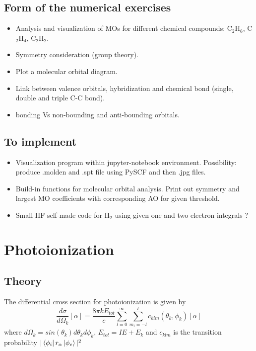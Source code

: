 \documentclass[12pt]{article}
\begin{document}
\subsection{Form of the numerical exercises}
\begin{itemize}
 \item Analysis and visualization of MOs for different chemical compounds: C$_2$H$_6$, C$_2$H$_4$, C$_2$H$_2$.
 \item Symmetry consideration (group theory).
 \item Plot a molecular orbital diagram.
 \item Link between valence orbitals, hybridization and chemical bond (single, double and triple C-C bond).
 \item bonding Vs non-bounding and anti-bounding orbitals.
\end{itemize}

\subsection{To implement}
\begin{itemize}
 \item Visualization program within jupyter-notebook environment. Possibility: produce .molden and .spt file using PySCF and then .jpg files.
 \item Build-in functions for molecular orbital analysis. Print out symmetry and largest MO coefficients with corresponding AO for given threshold. 
 \item Small HF self-made code for H$_2$ using given one and two electron integrals ?
\end{itemize}

\section{Photoionization}

\subsection{Theory}
The differential cross section for photoionization is given by 
\begin{equation}
\frac{d\sigma}{d\Omega_k}[\alpha] = \frac{8\pi kE_{tot}}{c}\sum_{l=0}^{\infty}\sum_{m_l=-l}^{l}c_{klm}(\theta_k,\phi_k)[\alpha]
\end{equation}
where $d\Omega_k=sin(\theta_k)d\theta_k d\phi_k$, $E_{tot} = IE+E_k$ and $c_{klm}$ is the transition probability $|\bra{\phi_{i}}r_{\alpha}\ket{\phi_e}|^2$ 
\end{document}
